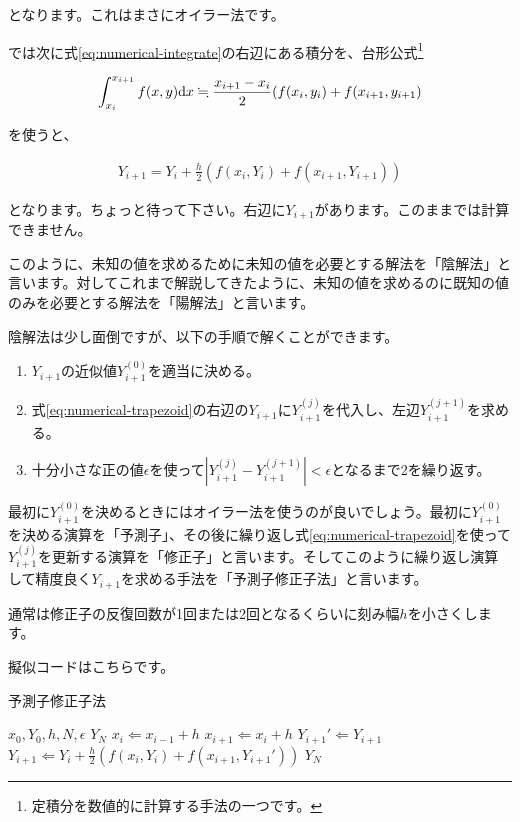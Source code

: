 \noindent
となります。これはまさにオイラー法です。

では次に式\ref{eq:numerical-integrate}の右辺にある積分を、台形公式\footnote{定積分を数値的に計算する手法の一つです。}

\begin{eqnarray}
    \int_{x_i}^{x_{i+1}}f(x,y)\dd x \fallingdotseq \frac{x_{i+1}-x_i}{2}(f(x_i,y_i)+f(x_{i+1},y_{i+1}) \setcounter{equation}{39}
\end{eqnarray}

\noindent
を使うと、

\begin{eqnarray}
    Y_{i+1}=Y_i+\frac{h}{2}(f(x_i,Y_i)+f(x_{i+1},Y_{i+1}))
    \label{eq:numerical-trapezoid}
\end{eqnarray}

\noindent
となります。ちょっと待って下さい。右辺に$Y_{i+1}$があります。このままでは計算できません。

このように、未知の値を求めるために未知の値を必要とする解法を「陰解法」と言います。対してこれまで解説してきたように、未知の値を求めるのに既知の値のみを必要とする解法を「陽解法」と言います。

陰解法は少し面倒ですが、以下の手順で解くことができます。

\begin{enumerate}
    \item $Y_{i+1}$の近似値$Y_{i+1}^{(0)}$を適当に決める。
    \item 式\ref{eq:numerical-trapezoid}の右辺の$Y_{i+1}$に$Y_{i+1}^{(j)}$を代入し、左辺$Y_{i+1}^{(j+1)}$を求める。
    \item 十分小さな正の値$\epsilon$を使って$|Y_{i+1}^{(j)}-Y_{i+1}^{(j+1)}|<\epsilon$となるまで2を繰り返す。
\end{enumerate}

最初に$Y_{i+1}^{(0)}$を決めるときにはオイラー法を使うのが良いでしょう。最初に$Y_{i+1}^{(0)}$を決める演算を「予測子」、その後に繰り返し式\ref{eq:numerical-trapezoid}を使って$Y_{i+1}^{(j)}$を更新する演算を「修正子」と言います。そしてこのように繰り返し演算して精度良く$Y_{i+1}$を求める手法を「予測子修正子法」と言います。

通常は修正子の反復回数が1回または2回となるくらいに刻み幅$h$を小さくします。

擬似コードはこちらです。

\begin{algorithm}
\label{al:predictor-Corrector}
\caption{予測子修正子法}
\begin{algorithmic}
\REQUIRE $x_0,Y_0,h,N,\epsilon$
\ENSURE $Y_N$
    \STATE $x_i\Leftarrow x_{i-1}+h$
    \STATE $x_{i+1}\Leftarrow x_i+h$
        \STATE $Y_{i+1}'\Leftarrow Y_{i+1}$
        \STATE $Y_{i+1}\Leftarrow Y_i+\frac{h}{2}(f(x_i,Y_i)+f(x_{i+1},Y_{i+1}'))$
    \ENDWHILE
\ENDFOR
\RETURN $Y_N$
\end{algorithmic}
\end{algorithm}










